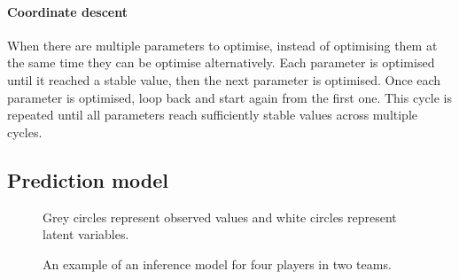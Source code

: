 \documentclass[12pt,a4paper]{book}
\newcommand\bs[1]{\boldsymbol{#1}}
\newcommand\note[1]{\vspace*{-0.5\baselineskip}\caption*{#1}}
\begin{document}
\paragraph{Coordinate descent}
When there are multiple parameters to optimise, instead of optimising them at the same time they can be optimise alternatively.
Each parameter is optimised until it reached a stable value, then the next parameter is optimised.
Once each parameter is optimised, loop back and start again from the first one.
This cycle is repeated until all parameters reach sufficiently stable values across multiple cycles.

\subsection{Prediction model}
\begin{figure}[ht]
\centering
{}
\caption{An example of an inference model for four players in two teams.}
\note{Grey circles represent observed values and white circles represent latent variables.}
\label{fig:four-player-model}
\end{figure}
\end{document}
